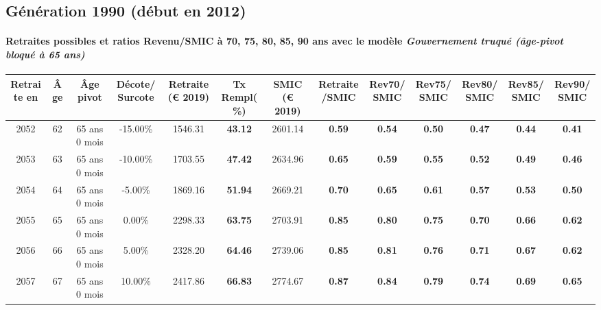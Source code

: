 \newpage 
 
\subsection{Génération 1990 (début en 2012)} 

\paragraph{Retraites possibles et ratios Revenu/SMIC à 70, 75, 80, 85, 90 ans avec le modèle \emph{Gouvernement truqué (âge-pivot bloqué à 65 ans)}}  
 
{ \scriptsize \begin{center} 
\begin{tabular}[htb]{|c|c||c|c||c|c||c||c|c|c|c|c|c|} 
\hline 
 Retraite en &  Âge &  Âge pivot &  Décote/Surcote &  Retraite (\euro{} 2019) &  Tx Rempl(\%) &  SMIC (\euro{} 2019) &  Retraite/SMIC &  Rev70/SMIC &  Rev75/SMIC &  Rev80/SMIC &  Rev85/SMIC &  Rev90/SMIC \\ 
\hline \hline 
 2052 &  62 &  65 ans 0 mois &  -15.00\% &  1546.31 &  {\bf 43.12} &  2601.14 &  {\bf {\color{red} 0.59}} &  {\bf {\color{red} 0.54}} &  {\bf {\color{red} 0.50}} &  {\bf {\color{red} 0.47}} &  {\bf {\color{red} 0.44}} &  {\bf {\color{red} 0.41}} \\ 
\hline 
 2053 &  63 &  65 ans 0 mois &  -10.00\% &  1703.55 &  {\bf 47.42} &  2634.96 &  {\bf {\color{red} 0.65}} &  {\bf {\color{red} 0.59}} &  {\bf {\color{red} 0.55}} &  {\bf {\color{red} 0.52}} &  {\bf {\color{red} 0.49}} &  {\bf {\color{red} 0.46}} \\ 
\hline 
 2054 &  64 &  65 ans 0 mois &  -5.00\% &  1869.16 &  {\bf 51.94} &  2669.21 &  {\bf {\color{red} 0.70}} &  {\bf {\color{red} 0.65}} &  {\bf {\color{red} 0.61}} &  {\bf {\color{red} 0.57}} &  {\bf {\color{red} 0.53}} &  {\bf {\color{red} 0.50}} \\ 
\hline 
 2055 &  65 &  65 ans 0 mois &  0.00\% &  2298.33 &  {\bf 63.75} &  2703.91 &  {\bf {\color{red} 0.85}} &  {\bf {\color{red} 0.80}} &  {\bf {\color{red} 0.75}} &  {\bf {\color{red} 0.70}} &  {\bf {\color{red} 0.66}} &  {\bf {\color{red} 0.62}} \\ 
\hline 
 2056 &  66 &  65 ans 0 mois &  5.00\% &  2328.20 &  {\bf 64.46} &  2739.06 &  {\bf {\color{red} 0.85}} &  {\bf {\color{red} 0.81}} &  {\bf {\color{red} 0.76}} &  {\bf {\color{red} 0.71}} &  {\bf {\color{red} 0.67}} &  {\bf {\color{red} 0.62}} \\ 
\hline 
 2057 &  67 &  65 ans 0 mois &  10.00\% &  2417.86 &  {\bf 66.83} &  2774.67 &  {\bf {\color{red} 0.87}} &  {\bf {\color{red} 0.84}} &  {\bf {\color{red} 0.79}} &  {\bf {\color{red} 0.74}} &  {\bf {\color{red} 0.69}} &  {\bf {\color{red} 0.65}} \\ 
\hline 
\hline 
\end{tabular} 
\end{center} } 
